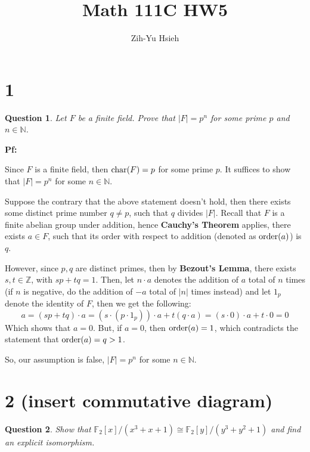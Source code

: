 \documentclass{article}
\title{Math 111C HW5}
\author{Zih-Yu Hsieh}
\newtheorem{question}{Question}
\begin{document}
\maketitle

\section*{1}
\begin{myBox}[]{}
    \begin{question}
        Let $F$ be a finite field. Prove that $|F|=p^n$ for some prime $p$ and $n\in\mathbb{N}$.
    \end{question}
\end{myBox}

\textbf{Pf:}

Since $F$ is a finite field, then $\textmd{char}(F)=p$ for some prime $p$. It suffices to show that $|F|=p^n$ for some $n\in\mathbb{N}$.

Suppose the contrary that the above statement doesn't hold, then there exists some distinct prime number $q\neq p$, such that $q$ divides $|F|$. Recall that $F$ is a finite abelian group under addition, hence \textbf{Cauchy's Theorem} applies, there exists $a\in F$, such that its order with respect to addition (denoted as $\textmd{order}(a)$) is $q$.

However, since $p,q$ are distinct primes, then by \textbf{Bezout's Lemma}, there exists $s,t\in\mathbb{Z}$, with $sp+tq = 1$. Then, let $n\cdot a$ denotes the addition of $a$ total of $n$ times (if $n$ is negative, do the addition of $-a$ total of $|n|$ times instead) and let $1_p$ denote the identity of $F$, then we get the following:
$$a = (sp+tq)\cdot a = (s\cdot (p\cdot 1_p))\cdot a + t(q\cdot a) = (s\cdot 0)\cdot a + t\cdot 0 = 0$$
Which shows that $a=0$. But, if $a=0$, then $\textmd{order}(a)=1$, which contradicts the statement that $\textmd{order}(a)=q>1$. 

So, our assumption is false, $|F|=p^n$ for some $n\in\mathbb{N}$.

\break

\section*{2 (insert commutative diagram)}
\begin{myBox}[]{}
    \begin{question}
        Show that $\mathbb{F}_2[x]/(x^3+x+1)\cong \mathbb{F}_2[y]/(y^3+y^2+1)$ and find an explicit isomorphism.
    \end{question}
\end{myBox}
\end{document}
